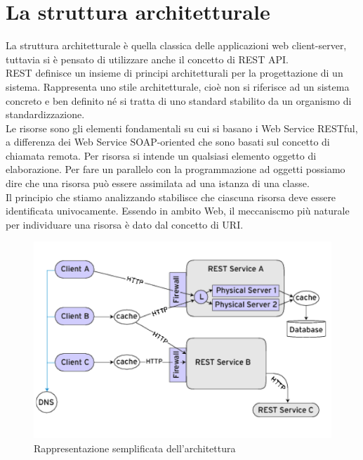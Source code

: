 \section{La struttura architetturale}
La struttura architetturale è quella classica delle applicazioni web client-server, tuttavia si è pensato di utilizzare anche il concetto di REST API.\\
REST \cite{REST} definisce un insieme di principi architetturali per la progettazione di un sistema. Rappresenta uno stile architetturale, cioè non si riferisce ad un sistema concreto e ben definito né si tratta di uno standard stabilito da un organismo di standardizzazione. \\ 
Le risorse sono gli elementi fondamentali su cui si basano i Web Service RESTful, a differenza dei Web Service SOAP-oriented che sono basati sul concetto di chiamata remota. Per risorsa si intende un qualsiasi elemento oggetto di elaborazione. Per fare un parallelo con la programmazione ad oggetti possiamo dire che una risorsa può essere assimilata ad una istanza di una classe.\\
Il principio che stiamo analizzando stabilisce che ciascuna risorsa deve essere identificata univocamente. Essendo in ambito Web, il meccaniscmo più naturale per individuare una risorsa è dato dal concetto di URI. \\
\begin{figure}[H]
	\centering
	\includegraphics[scale=0.5]{Implementazione/rest.png}
	\caption{Rappresentazione semplificata dell'architettura }
	\label{fig:rest}
\end{figure}

